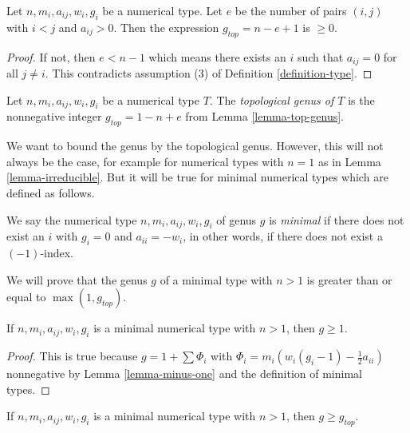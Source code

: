 \begin{lemma}
\label{lemma-top-genus}
Let $n, m_i, a_{ij}, w_i, g_i$ be a numerical type.
Let $e$ be the number of pairs $(i, j)$ with $i < j$ and $a_{ij} > 0$.
Then the expression $g_{top} = n - e + 1$ is $\geq 0$.
\end{lemma}

\begin{proof}
If not, then $e < n - 1$ which means there exists an $i$ such that
$a_{ij} = 0$ for all $j \not = i$. This contradicts assumption
(3) of Definition \ref{definition-type}.
\end{proof}

\begin{definition}
\label{definition-top-genus}
Let $n, m_i, a_{ij}, w_i, g_i$ be a numerical type $T$. The
{\it topological genus of $T$} is the nonnegative integer
$g_{top} = 1 - n + e$ from Lemma \ref{lemma-top-genus}.
\end{definition}

\noindent
We want to bound the genus by the topological genus. However, this
will not always be the case, for example for numerical types
with $n = 1$ as in Lemma \ref{lemma-irreducible}. But it will
be true for minimal numerical types which are defined as follows.

\begin{definition}
\label{definition-type-minimal}
We say the numerical type $n, m_i, a_{ij}, w_i, g_i$ of genus $g$
is {\it minimal} if there does not exist an $i$
with $g_i = 0$ and $a_{ii} = -w_i$, in other words, if there
does not exist a $(-1)$-index.
\end{definition}

\noindent
We will prove that the genus $g$ of a minimal type with $n > 1$
is greater than or equal to $\max(1, g_{top})$.

\begin{lemma}
\label{lemma-non-irreducible-minimal-type-genus-at-least-one}
If $n, m_i, a_{ij}, w_i, g_i$ is a minimal numerical type
with $n > 1$, then $g \geq 1$.
\end{lemma}

\begin{proof}
This is true because $g = 1 + \sum \Phi_i$ with
$\Phi_i = m_i(w_i(g_i - 1) - \frac{1}{2} a_{ii})$ nonnegative
by Lemma \ref{lemma-minus-one} and the definition of minimal types.
\end{proof}

\begin{lemma}
\label{lemma-genus-nonnegative}
If $n, m_i, a_{ij}, w_i, g_i$ is a minimal numerical type
with $n > 1$, then $g \geq g_{top}$.
\end{lemma}

